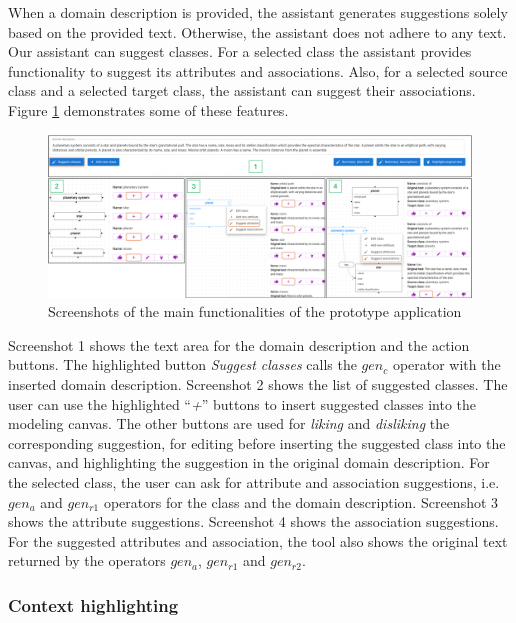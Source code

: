 When a domain description is provided, the assistant generates suggestions solely based on the provided text. Otherwise, the assistant does not adhere to any text. Our assistant can suggest classes. For a selected class the assistant provides functionality to suggest its attributes and associations. Also, for a selected source class and a selected target class, the assistant can suggest their associations. Figure \ref{fig:assistant-features} demonstrates some of these features.

\begin{figure}[!h]
    \centering
    \includegraphics[scale=0.22]{img/assistant-features.png}
    \caption{\centering Screenshots of the main functionalities of the prototype application}
    \label{fig:assistant-features}
\end{figure}

Screenshot 1 shows the text area for the domain description and the action buttons. The highlighted button \textit{Suggest classes} calls the $gen_c$ operator with the inserted domain description. Screenshot 2 shows the list of suggested classes. The user can use the highlighted ``\textit{+}'' buttons to insert suggested classes into the modeling canvas. The other buttons are used for \textit{liking} and \textit{disliking} the corresponding suggestion, for editing before inserting the suggested class into the canvas, and highlighting the suggestion in the original domain description. For the selected class, the user can ask for attribute and association suggestions, i.e. $gen_a$ and $gen_{r1}$ operators for the class and the domain description. Screenshot 3 shows the attribute suggestions. Screenshot 4 shows the association suggestions. For the suggested attributes and association, the tool also shows the original text returned by the operators $gen_a$, $gen_{r1}$ and $gen_{r2}$.


\subsubsection{Context highlighting}
\label{sec:context_highlighting}

